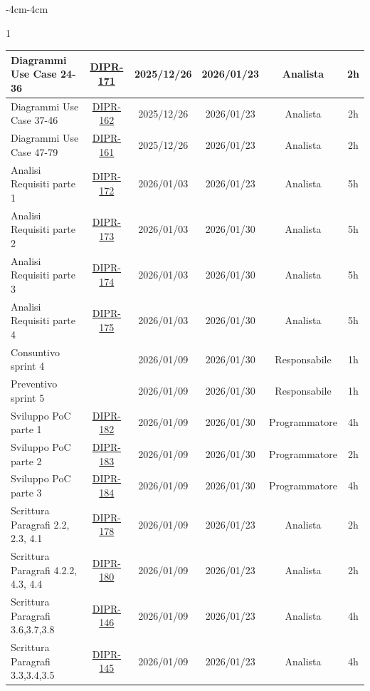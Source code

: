 \documentclass[a4paper,12pt]{article}
\begin{document}
\begin{table}[H]
\begin{adjustwidth}{-4cm}{-4cm}
\begin{spacing}{1}
\begin{tabular}{|p{4cm}|c|c|c|c|c|}
        \hline
        Diagrammi Use Case 24-36 & \href{https://7zpus.atlassian.net/browse/DIPR-171}{DIPR-171} & 2025/12/26 & 2026/01/23 & Analista & 2h \\
        \hline
        Diagrammi Use Case 37-46 & \href{https://7zpus.atlassian.net/browse/DIPR-162}{DIPR-162} & 2025/12/26 & 2026/01/23 & Analista & 2h \\
        \hline
        Diagrammi Use Case 47-79 & \href{https://7zpus.atlassian.net/browse/DIPR-161}{DIPR-161} & 2025/12/26 & 2026/01/23 & Analista & 2h \\
        \hline
        Analisi Requisiti parte 1 & \href{https://7zpus.atlassian.net/browse/DIPR-172}{DIPR-172} & 2026/01/03 & 2026/01/23 & Analista & 5h \\
        \hline
        Analisi Requisiti parte 2 & \href{https://7zpus.atlassian.net/browse/DIPR-173}{DIPR-173} & 2026/01/03 & 2026/01/30 & Analista & 5h \\
        \hline
        Analisi Requisiti parte 3 & \href{https://7zpus.atlassian.net/browse/DIPR-174}{DIPR-174} & 2026/01/03 & 2026/01/30 & Analista & 5h \\
        \hline
        Analisi Requisiti parte 4 & \href{https://7zpus.atlassian.net/browse/DIPR-175}{DIPR-175} & 2026/01/03 & 2026/01/30 & Analista & 5h \\
        \hline
        Consuntivo sprint 4 &  & 2026/01/09 & 2026/01/30 & Responsabile & 1h \\
        \hline
        Preventivo sprint 5 &  & 2026/01/09 & 2026/01/30 & Responsabile & 1h \\
        \hline
        Sviluppo PoC parte 1 & \href{https://7zpus.atlassian.net/browse/DIPR-182}{DIPR-182} & 2026/01/09 & 2026/01/30 & Programmatore & 4h \\
        \hline
        Sviluppo PoC parte 2 & \href{https://7zpus.atlassian.net/browse/DIPR-183}{DIPR-183} & 2026/01/09 & 2026/01/30 & Programmatore & 2h \\
        \hline
        Sviluppo PoC parte 3 & \href{https://7zpus.atlassian.net/browse/DIPR-184}{DIPR-184} & 2026/01/09 & 2026/01/30 & Programmatore & 4h \\
        \hline
        Scrittura Paragrafi 2.2, 2.3, 4.1 & \href{https://7zpus.atlassian.net/browse/DIPR-178}{DIPR-178} & 2026/01/09 & 2026/01/23 & Analista & 2h \\
        \hline
        Scrittura Paragrafi 4.2.2, 4.3, 4.4 & \href{https://7zpus.atlassian.net/browse/DIPR-180}{DIPR-180} & 2026/01/09 & 2026/01/23 & Analista & 2h \\
        \hline
        Scrittura Paragrafi 3.6,3.7,3.8& \href{https://7zpus.atlassian.net/browse/DIPR-146}{DIPR-146} & 2026/01/09 & 2026/01/23 & Analista & 4h \\
        \hline
        Scrittura Paragrafi 3.3,3.4,3.5 & \href{https://7zpus.atlassian.net/browse/DIPR-145}{DIPR-145} & 2026/01/09 & 2026/01/23 & Analista & 4h \\
        \hline


\end{tabular}
\end{spacing}
\end{adjustwidth}
\end{table}
\end{document}
